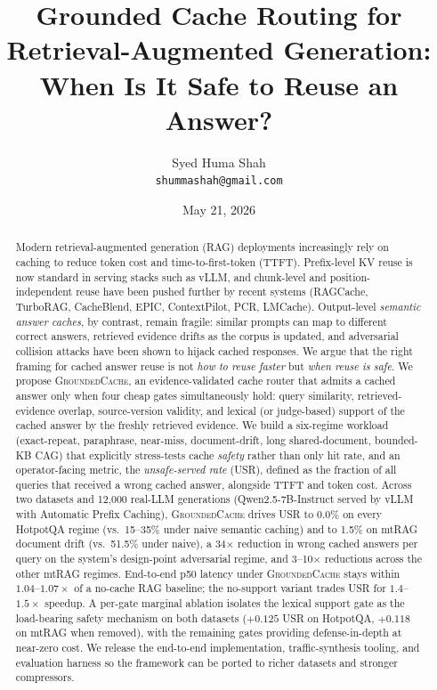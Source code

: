 \documentclass[11pt]{article}
\title{Grounded Cache Routing for Retrieval-Augmented Generation:\\
       When Is It Safe to Reuse an Answer?}
\author{Syed Huma Shah\\
        \texttt{shummashah@gmail.com}}
\date{May 21, 2026}
\newcommand{\sys}{\textsc{GroundedCache}\xspace}
\begin{document}
\maketitle

\begin{abstract}
Modern retrieval-augmented generation (RAG) deployments increasingly rely on
caching to reduce token cost and time-to-first-token (TTFT). Prefix-level KV
reuse is now standard in serving stacks such as vLLM, and chunk-level and
position-independent reuse have been pushed further by recent systems
(RAGCache, TurboRAG, CacheBlend, EPIC, ContextPilot, PCR, LMCache).
Output-level \emph{semantic answer caches}, by contrast, remain fragile:
similar prompts can map to different correct answers, retrieved evidence
drifts as the corpus is updated, and adversarial collision attacks have been
shown to hijack cached responses. We argue that the right framing for cached
answer reuse is not \emph{how to reuse faster} but \emph{when reuse is safe}.
We propose \sys, an evidence-validated cache router that admits a cached
answer only when four cheap gates simultaneously hold: query similarity,
retrieved-evidence overlap, source-version validity, and lexical (or
judge-based) support of the cached answer by the freshly retrieved evidence.
We build a six-regime workload (exact-repeat, paraphrase, near-miss,
document-drift, long shared-document, bounded-KB CAG) that explicitly
stress-tests cache \emph{safety} rather than only hit rate, and an
operator-facing metric, the \emph{unsafe-served rate} (USR), defined as the
fraction of all queries that received a wrong cached answer, alongside
TTFT and token cost. Across two datasets and 12{,}000 real-LLM generations
(Qwen2.5-7B-Instruct served by vLLM with Automatic Prefix Caching), \sys{}
drives USR to 0.0\% on every HotpotQA regime (vs.\ 15--35\% under naive
semantic caching) and to 1.5\% on mtRAG document drift (vs.\
51.5\% under naive), a 34$\times$ reduction in wrong cached answers per
query on the system's design-point adversarial regime, and 3--10$\times$
reductions across the other mtRAG regimes. End-to-end p50 latency under
\sys{} stays within $1.04$--$1.07\times$ of a no-cache RAG baseline; the
no-support variant trades USR for $1.4$--$1.5\times$ speedup. A
per-gate marginal ablation isolates the lexical support gate as the
load-bearing safety mechanism on both datasets ($+0.125$ USR on HotpotQA,
$+0.118$ on mtRAG when removed), with the remaining gates providing
defense-in-depth at near-zero cost. We
release the end-to-end implementation, traffic-synthesis tooling,
and evaluation harness so the framework can be ported to richer
datasets and stronger compressors.
\end{abstract}
\end{document}
